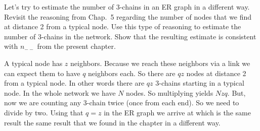 Let's try to estimate the number of 3-chains in an ER graph in a different way. Revisit the reasoning from Chap.~5 regarding the number of nodes that we find at distance 2 from a typical node. 
Use this type of reasoning to estimate the number of 3-chains in the network. Show that the resulting estimate is consistent with $n_{--}$ from the present chapter.   

\solution
A typical node has $z$ neighbors. Because we reach these neighbors via a link we can expect them to have $q$ neighbors each. So there are $qz$ nodes at distance 2 from a typical node. In other words there are $qz$ 3-chains starting in a typical node. In the whole network we have $N$ nodes. So multiplying yields $Nzq$. But, now we are counting any 3-chain twice (once from each end). So we need to divide by two. Using that $q=z$ in the ER graph we arrive at  
which is the same result the same result that we found in the chapter in a different way.